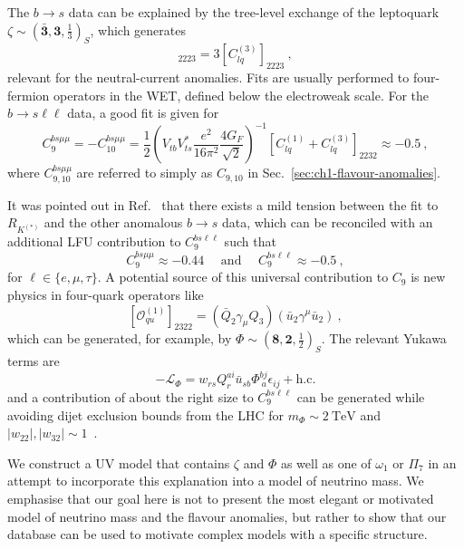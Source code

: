The $b \to s$ data can be explained by the tree-level exchange of the leptoquark
$\zeta \sim (\mathbf{\bar{3}}, \mathbf{3}, \tfrac{1}{3})_{S}$, which generates
\begin{equation}
  [C_{lq}^{(1)}]_{2223} = 3 [C_{lq}^{(3)}]_{2223} \ ,
\end{equation}
relevant for the neutral-current anomalies. Fits are usually performed to
four-fermion operators in the WET, defined below the electroweak scale. For the
$b \to s \ell \ell$ data, a good fit is given for~\cite{Aebischer:2019mlg}
\begin{equation}
  C_{9}^{bs\mu\mu} = - C_{10}^{bs\mu\mu} = \frac{1}{2} \left(  V_{tb} V_{ts}^{*} \frac{e^{2}}{16\pi^{2}} \frac{4 G_{F}}{\sqrt{2}} \right)^{-1} \left[ C_{lq}^{(1)} + C_{lq}^{(3)} \right]_{2232} \approx -0.5 \ ,
\end{equation}
where $C_{9,10}^{bs\mu\mu}$ are referred to simply as $C_{9,10}$ in
Sec.~\ref{sec:ch1-flavour-anomalies}.

It was pointed out in Ref.~\cite{Aebischer:2019mlg} that there exists a mild
tension between the fit to $R_{K^{(*)}}$ and the other anomalous $b \to s$ data,
which can be reconciled with an additional LFU contribution to
$C_{9}^{bs\ell\ell}$ such that
\begin{equation}
  C_{9}^{bs\mu\mu} \approx -0.44\quad \text{ and }\quad C_{9}^{bs\ell\ell} \approx -0.5 \ ,
\end{equation}
for $\ell \in \{e, \mu, \tau\}$. A potential source of this universal
contribution to $C_{9}$ is new physics in four-quark operators
like~\cite{Aebischer:2019mlg}
\begin{equation}
  \label{eq:ouq}
  [\mathcal{O}_{qu}^{(1)}]_{2322} = (\bar{Q}_{2} \gamma_{\mu} Q_{3}) (\bar{u}_{2} \gamma^{\mu} \bar{u}_{2}) \ ,
\end{equation}
which can be generated, for example, by
$\Phi \sim (\mathbf{8}, \mathbf{2}, \tfrac{1}{2})_{S}$. The relevant Yukawa terms are
\begin{equation}
  \label{eq:phi-yuks}
  - \mathscr{L}_{\Phi} = w_{rs} Q_{r}^{ai} \bar{u}_{sb} \Phi^{bj}_{\ a} \epsilon_{ij} + \text{h.c.}
\end{equation}
and a contribution of about the right size to $C_{9}^{bs\ell\ell}$ can be
generated while avoiding dijet exclusion bounds from the LHC for
$m_{\Phi} \sim \SI{2}{\TeV}$ and
$|w_{22}|, |w_{32}| \sim 1$~\cite{Aebischer:2019mlg}.

We construct a UV model that contains $\zeta$ and $\Phi$ as well as one of
$\omega_{1}$ or $\Pi_{7}$ in an attempt to incorporate this explanation into a
model of neutrino mass. We emphasise that our goal here is not to present the
most elegant or motivated model of neutrino mass and the flavour anomalies, but
rather to show that our database can be used to motivate complex models with a
specific structure.

